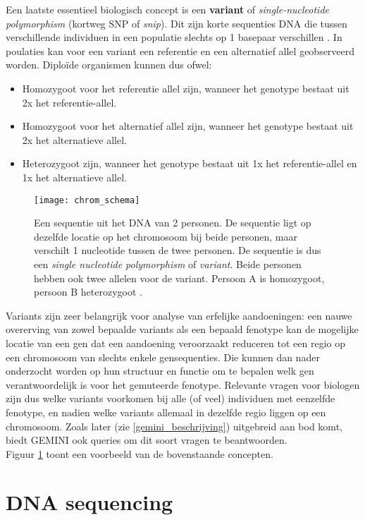 Een laatste essentieel biologisch concept is een \textbf{variant} of \textit{single-nucleotide polymorphism} (kortweg SNP of \textit{snip}). Dit zijn korte sequenties DNA die tussen verschillende individuen in een populatie slechts op 1 basepaar verschillen \cite{alberts2007molecular}. In poulaties kan voor een variant een referentie en een alternatief allel geobserveerd worden. Diplo\"ide organismen kunnen dus ofwel:
\begin{itemize}
\item Homozygoot voor het referentie allel zijn, wanneer het genotype bestaat uit 2x het referentie-allel.
\item Homozygoot voor het alternatief allel zijn, wanneer het genotype bestaat uit 2x het alternatieve allel.
\item Heterozygoot zijn, wanneer het genotype bestaat uit 1x het referentie-allel en 1x het alternatieve allel.
\end{itemize}
\begin{figure}[!hb]
\texttt{[image: chrom\_schema]}
\caption{Een sequentie uit het DNA van 2 personen. De sequentie ligt op dezelfde locatie op het chromosoom bij beide personen, maar verschilt 1 nucleotide tussen de twee personen. De sequentie is dus een \textit{single nucleotide polymorphism} of \textit{variant}. Beide personen hebben ook twee allelen voor de variant. Persoon A is homozygoot, persoon B heterozygoot \cite{chrom_clipart}.}
\label{chrom_schema}
\end{figure}
Variants zijn zeer belangrijk voor analyse van erfelijke aandoeningen: een nauwe overerving van zowel bepaalde variants als een bepaald fenotype kan de mogelijke locatie van een gen dat een aandoening veroorzaakt reduceren tot een regio op een chromosoom van slechts enkele gensequenties. Die kunnen dan nader onderzocht worden op hun structuur en functie om te bepalen welk gen verantwoordelijk is voor het gemuteerde fenotype. Relevante vragen voor biologen zijn dus welke variants voorkomen bij alle (of veel) individuen met eenzelfde fenotype, en nadien welke variants allemaal in dezelfde regio liggen op een chromosoom. Zoals later (zie \ref{gemini_beschrijving}) uitgebreid aan bod komt, biedt GEMINI ook queries om dit soort vragen te beantwoorden.\\
Figuur \ref{chrom_schema} toont een voorbeeld van de bovenstaande concepten.\\

\section{DNA sequencing}

